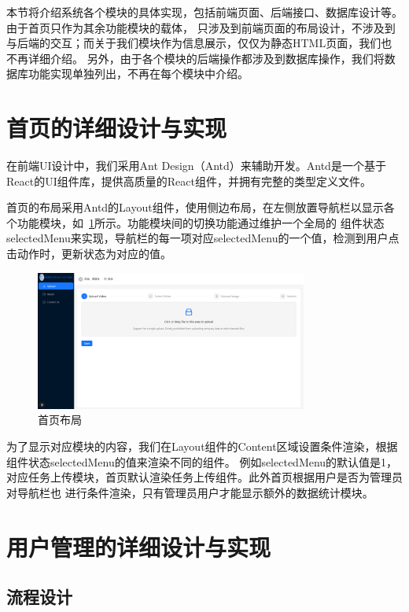 本节将介绍系统各个模块的具体实现，包括前端页面、后端接口、数据库设计等。由于首页只作为其余功能模块的载体，
只涉及到前端页面的布局设计，不涉及到与后端的交互；而关于我们模块作为信息展示，仅仅为静态HTML页面，我们也不再详细介绍。
另外，由于各个模块的后端操作都涉及到数据库操作，我们将数据库功能实现单独列出，不再在每个模块中介绍。

\section{首页的详细设计与实现}

在前端UI设计中，我们采用Ant Design（Antd）\cite{antd}来辅助开发。Antd是一个基于React的UI组件库，提供高质量的React组件，并拥有完整的类型定义文件。

首页的布局采用Antd的Layout组件，使用侧边布局，在左侧放置导航栏以显示各个功能模块，如~\ref{fig:app-dashboard}所示。功能模块间的切换功能通过维护一个全局的
组件状态selectedMenu来实现，导航栏的每一项对应selectedMenu的一个值，检测到用户点击动作时，更新状态为对应的值。

\begin{figure}[ht]
    \centering
    \includegraphics[width=0.8\textwidth]{source/img/app_dashboard.png}
    \caption{首页布局}
    \label{fig:app-dashboard}
\end{figure}

为了显示对应模块的内容，我们在Layout组件的Content区域设置条件渲染，根据组件状态selectedMenu的值来渲染不同的组件。
例如selectedMenu的默认值是1，对应任务上传模块，首页默认渲染任务上传组件。此外首页根据用户是否为管理员对导航栏也
进行条件渲染，只有管理员用户才能显示额外的数据统计模块。

\section{用户管理的详细设计与实现}

\subsection{流程设计}

